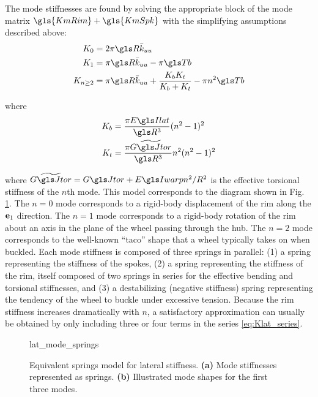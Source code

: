 \documentclass[\rootdir/thesis.tex]{subfiles}
\begin{document}
The mode stiffnesses are found by solving the appropriate block of the mode matrix $\gls{KmRim} + \gls{KmSpk}$ with the simplifying assumptions described above:
\begin{subequations}\label{eq:Kn}
\begin{align}
K_0 &= 2\pi\R\kuu \label{eq:Kn_0}\\
K_1 &= \pi\R\kuu - \pi\Tb\\
K_{n\geq2} & = \pi\R\kuu + \frac{\Kbend \Ktors}{\Kbend + \Ktors} - \pi n^2 \Tb \label{eq:Kn_n}
\end{align}
\end{subequations}

where
\begin{align*}
\Kbend &= \frac{\pi \EIl}{\R^3} (n^2-1)^2\\
\Ktors &= \frac{\pi \widetilde{\GJ}}{\R^3}n^2(n^2-1)^2
\end{align*}

where $\widetilde{\GJ} = \GJ + \EIw n^2/R^2$ is the effective torsional stiffness of the $n$th mode. This model corresponds to the diagram shown in Fig. \ref{fig:lat_mode_springs}. The $n=0$ mode corresponds to a rigid-body displacement of the rim along the $\mathbf{e}_1$ direction. The $n=1$ mode corresponds to a rigid-body rotation of the rim about an axis in the plane of the wheel passing through the hub. The $n=2$ mode corresponds to the well-known ``taco'' shape that a wheel typically takes on when buckled. Each mode stiffness is composed of three springs in parallel: (1) a spring representing the stiffness of the spokes, (2) a spring representing the stiffness of the rim, itself composed of two springs in series for the effective bending and torsional stiffnesses, and (3) a destabilizing (negative stiffness) spring representing the tendency of the wheel to buckle under excessive tension. Because the rim stiffness increases dramatically with $n$, a satisfactory approximation can usually be obtained by only including three or four terms in the series \eqref{eq:Klat_series}.

\begin{figure}[t]
\centering
{lat_mode_springs}
\caption[Equivalent spring model for lateral stiffness]{Equivalent springs model for lateral stiffness. \textbf{(a)} Mode stiffnesses represented as springs. \textbf{(b)} Illustrated mode shapes for the first three modes.}
\label{fig:lat_mode_springs}
\end{figure}
\end{document}
